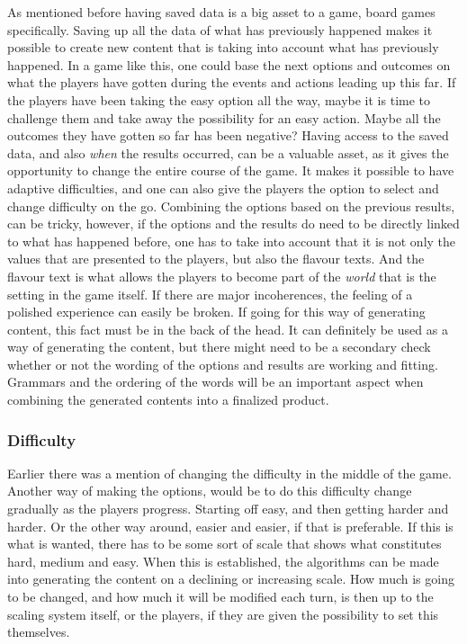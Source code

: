 As mentioned before having saved data is a big asset to a game, board games specifically. Saving up all the data of what has previously happened makes it possible to create new content that is taking into account what has previously happened. In a game like this, one could base the next options and outcomes on what the players have gotten during the events and actions leading up this far. If the players have been taking the easy option all the way, maybe it is time to challenge them and take away the possibility for an easy action. Maybe all the outcomes they have gotten so far has been negative? Having access to the saved data, and also \textit{when} the results occurred, can be a valuable asset, as it gives the opportunity to change the entire course of the game. It makes it possible to have adaptive difficulties, and one can also give the players the option to select and change difficulty on the go. Combining the options based on the previous results, can be tricky, however, if the options and the results do need to be directly linked to what has happened before, one has to take into account that it is not only the values that are presented to the players, but also the flavour texts. And the flavour text is what allows the players to become part of the \textit{world} that is the setting in the game itself. If there are major incoherences, the feeling of a polished experience can easily be broken. If going for this way of generating content, this fact must be in the back of the head. It can definitely be used as a way of generating the content, but there might need to be a secondary check whether or not the wording of the options and results are working and fitting. Grammars and the ordering of the words will be an important aspect when combining the generated contents into a finalized product.

\subsubsection{Difficulty}
Earlier there was a mention of changing the difficulty in the middle of the game. Another way of making the options, would be to do this difficulty change gradually as the players progress. Starting off easy, and then getting harder and harder. Or the other way around, easier and easier, if that is preferable. If this is what is wanted, there has to be some sort of scale that shows what constitutes hard, medium and easy. When this is established, the algorithms can be made into generating the content on a declining or increasing scale. How much is going to be changed, and how much it will be modified each turn, is then up to the scaling system itself, or the players, if they are given the possibility to set this themselves.

